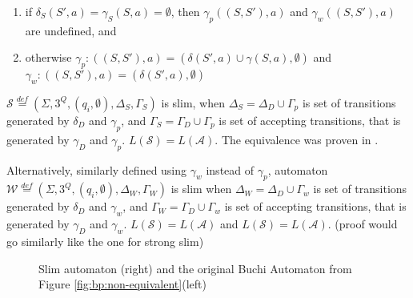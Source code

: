 \documentclass[
	digital
nolof, nolot
]{fithesis3}
\newcommand{\cA}{\mathcal{A}}
\newcommand{\cS}{\mathcal{S}}
\newcommand{\lA}{L(\cA)}
\newcommand{\lS}{L(\cS)}
\newcommand{\eqdef}{\overset{def}{=}}
\newcommand{\flushed}{\text{\emoji{flushed}}}
\newcommand{\hell}{\text{\emoji{fire}}}
\newcommand{\heaven}{\text{\emoji{innocent}}}
\begin{document}
			\begin{enumerate}
				\item if $\delta_S(S',a) = \gamma_S(S, a) = \emptyset$, then $\gamma_{p}((S,S'), a)$ and $\gamma_{w}((S,S'), a)$ are undefined, and
				\item otherwise
				$\gamma_{p}:((S,S'),a)=(\delta(S',a)\cup\gamma(S, a),\emptyset)$ and $\gamma_{w}:((S,S'),a)=(\delta(S',a),\emptyset)$
			\end{enumerate}
			
			
			$\cS\eqdef(\Sigma, 3^Q, (q_i,\emptyset), \Delta_S ,\Gamma_S)$ is slim, when
			$\Delta_S=\Delta_D \cup \Gamma_p$ is set of transitions generated by $\delta_D$ and $\gamma_p$, and
			$\Gamma_S=\Gamma_D \cup \Gamma_p$ is set of accepting transitions, that is generated by $\gamma_D$ and $\gamma_p$. $\lS = \lA$. The equivalence was proven in \cite{hlavni}.
			
			Alternatively, similarly defined using $\gamma_w$ instead of $\gamma_{p}$, automaton $\mathcal{W}\eqdef(\Sigma, 3^Q, (q_i,\emptyset), \Delta_W, \Gamma_W)$ is slim  when
			$\Delta_W=\Delta_D \cup \Gamma_w$ is set of transitions generated by $\delta_D$ and $\gamma_w$, and
			$\Gamma_W=\Gamma_D \cup \Gamma_w$ is set of accepting transitions, that is generated by $\gamma_D$ and $\gamma_w$. $\lS = \lA$ and $\lS=\lA$. (proof would go similarly like the one for strong slim)
			
			\begin{figure}[ht]
				\begin{center}
				\end{center}
				\caption{Slim automaton (right) and the original Buchi Automaton from Figure \ref{fig:bp:non-equivalent}(left)}
				\label{fig:slim:equivalent}
			\end{figure}
\end{document}
